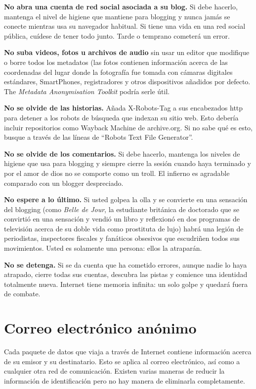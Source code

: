 \documentclass[10pt,a5paper,twoside,,]{book}
\begin{document}
\textbf{No abra una cuenta de red social asociada a su blog.} Si debe
hacerlo, mantenga el nivel de higiene que mantiene para blogging y nunca
jamás se conecte mientras usa su navegador habitual. Si tiene una vida
en una red social pública, cuídese de tener todo junto. Tarde o temprano
cometerá un error.

\textbf{No suba videos, fotos u archivos de audio} sin usar un editor
que modifique o borre todos los metadatos (las fotos contienen
información acerca de las coordenadas del lugar donde la fotografía fue
tomada con cámaras digitales estándares, SmartPhones, registradores y
otros dispositivos añadidos por defecto. The \emph{Metadata
Anonymisation Toolkit} podría serle útil.

\textbf{No se olvide de las historias.} Añada X-Robots-Tag a sus
encabezados http para detener a los robots de búsqueda que indexan su
sitio web. Esto debería incluir repositorios como Wayback Machine de
archive.org. Si no sabe qué es esto, busque a través de las líneas de
``Robots Text File Generator''.

\textbf{No se olvide de los comentarios.} Si debe hacerlo, mantenga los
niveles de higiene que usa para blogging y siempre cierre la sesión
cuando haya terminado y por el amor de dios no se comporte como un
troll. El infierno es agradable comparado con un blogger despreciado.

\textbf{No espere a lo último.} Si usted golpea la olla y se convierte
en una sensación del blogging (como \emph{Belle de Jour}, la estudiante
británica de doctorado que se convirtió en una sensación y vendió un
libro y reflexionó en dos programas de televisión acerca de su doble
vida como prostituta de lujo) habrá una legión de periodistas,
inspectores fiscales y fanáticos obsesivos que escudriñen todos sus
movimientos. Usted es solamente una persona: ellos la atraparán.

\textbf{No se detenga.} Si se da cuenta que ha cometido errores, aunque
nadie lo haya atrapado, cierre todas sus cuentas, descubra las pistas y
comience una identidad totalmente nueva. Internet tiene memoria
infinita: un solo golpe y quedará fuera de combate.

\chapter{Correo electrónico
anónimo}\label{correo-electruxf3nico-anuxf3nimo}

Cada paquete de datos que viaja a través de Internet contiene
información acerca de su emisor y su destinatario. Esto se aplica al
correo electrónico, así como a cualquier otra red de comunicación.
Existen varias maneras de reducir la información de identificación pero
no hay manera de eliminarla completamente.
\end{document}
